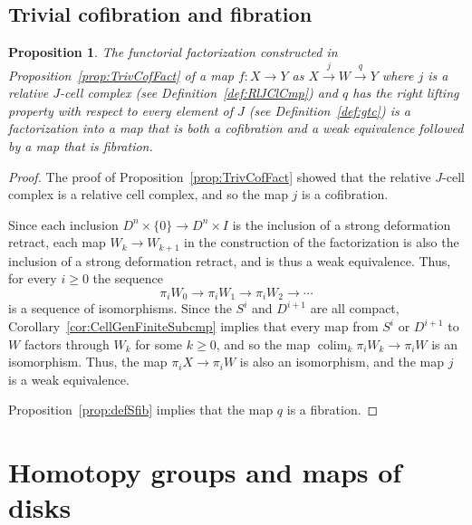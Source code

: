 \documentclass[12pt]{amsart}
\numberwithin{equation}{section}
\theoremstyle{slplain}
\newtheorem{prop}[equation]{Proposition}
\theoremstyle{definition}
\theoremstyle{remark}
\newcommand{\propref}{Proposition~\ref}
\newcommand{\defref}{Definition~\ref}
\DeclareMathOperator*{\colim}{colim}
\begin{document}
\subsection{Trivial cofibration and fibration}
\label{sec:TrCofFib}

\begin{prop}
  \label{prop:TrCofFib}
  The functorial factorization constructed in
  \propref{prop:TrivCofFact} of a map $f\colon X \to Y$ as $X
  \xrightarrow{j} W \xrightarrow{q} Y$ where $j$ is a relative
  $J$-cell complex (see \defref{def:RlJClCmp}) and $q$ has the right
  lifting property with respect to every element of $J$ (see
  \defref{def:gtc}) is a factorization into a map that is both a
  cofibration and a weak equivalence followed by a map that is
  fibration.
\end{prop}

\begin{proof}
  The proof of \propref{prop:TrivCofFact} showed that the relative
  $J$-cell complex is a relative cell complex, and so the map $j$ is a
  cofibration.

  Since each inclusion $D^{n}\times\{0\} \to D^{n}\times I$ is the
  inclusion of a strong deformation retract, each map $W_{k} \to
  W_{k+1}$ in the construction of the factorization is also the
  inclusion of a strong deformation retract, and is thus a weak
  equivalence.  Thus, for every $i \ge 0$ the sequence
  \begin{displaymath}
    \pi_{i} W_{0} \to \pi_{i} W_{1} \to \pi_{i} W_{2} \to \cdots
  \end{displaymath}
  is a sequence of isomorphisms.  Since the $S^{i}$ and $D^{i+1}$ are
  all compact, Corollary~\ref{cor:CellGenFiniteSubcmp} implies that every map
  from $S^{i}$ or $D^{i+1}$ to $W$ factors through $W_{k}$ for some $k
  \ge 0$, and so the map $\colim_{k} \pi_{i} W_{k} \to \pi_{i} W$ is
  an isomorphism.  Thus, the map $\pi_{i}X \to \pi_{i}W$ is also an
  isomorphism, and the map $j$ is a weak equivalence.

  \propref{prop:defSfib} implies that the map $q$ is a fibration.
\end{proof}

\section{Homotopy groups and maps of disks}
\label{sec:MpDsk}
\end{document}
